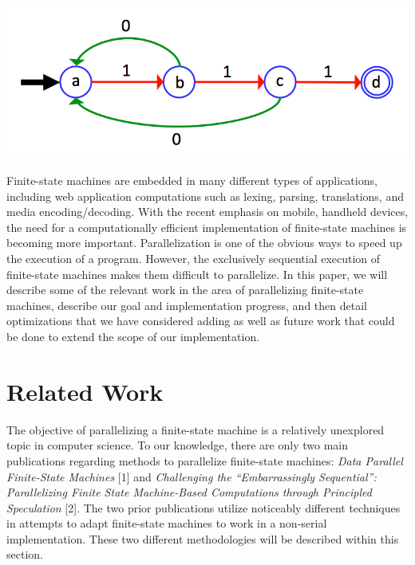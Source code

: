 \documentclass[11pt]{sigplanconf}
\begin{document}
\includegraphics[width=\linewidth]{fsm_diagram.png}

Finite-state machines are embedded in many different types of applications, including web application computations such as lexing, parsing, translations, and media encoding/decoding. With the recent emphasis on mobile, handheld devices, the need for a computationally efficient implementation of finite-state machines is becoming more important. Parallelization is one of the obvious ways to speed up the execution of a program. However, the exclusively sequential execution of finite-state machines makes them difficult to parallelize. In this paper, we will describe some of the relevant work in the area of parallelizing finite-state machines, describe our goal and implementation progress, and then detail optimizations that we have considered adding as well as future work that could be done to extend the scope of our implementation. 
 
\section{Related Work}
 
The objective of parallelizing a finite-state machine is a relatively unexplored topic in computer science. To our knowledge, there are only two main publications regarding methods to parallelize finite-state machines: \textit{Data Parallel Finite-State Machines} [1] and \textit{Challenging the ``Embarrassingly Sequential'': Parallelizing Finite State Machine-Based Computations through Principled Speculation} [2]. The two prior publications utilize noticeably different techniques in attempts to adapt finite-state machines to work in a non-serial implementation. These two different methodologies will be described within this section.
\end{document}
